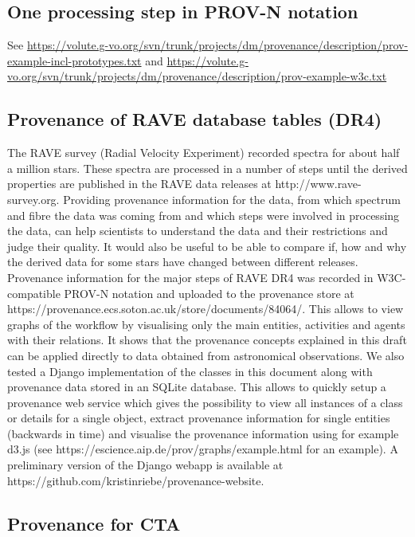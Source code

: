 \subsection{One processing step in PROV-N notation}

See \url{https://volute.g-vo.org/svn/trunk/projects/dm/provenance/description/prov-example-incl-prototypes.txt}
and \url{https://volute.g-vo.org/svn/trunk/projects/dm/provenance/description/prov-example-w3c.txt}


\subsection{Provenance of RAVE database tables (DR4)}
The RAVE survey (Radial Velocity Experiment) recorded spectra for about half a 
million stars. These spectra are processed in a number of steps until the 
derived properties are published in the RAVE data releases at http://www.rave-survey.org.
Providing provenance information for the data, from which spectrum and fibre the
data was coming from and which steps were involved in processing the data, can help scientists
to understand the data and their restrictions and judge their quality.
It would also be useful to be able to compare if, how and why the derived data 
for some stars have changed between different releases.
Provenance information for the major steps of RAVE DR4 was recorded in W3C-compatible 
PROV-N notation and uploaded to the provenance store at 
https://provenance.ecs.soton.ac.uk/store/documents/84064/. This allows to view 
graphs of the workflow by visualising only the main entities, activities and agents 
with their relations. It shows that the provenance concepts explained in this draft 
can be applied directly to data obtained from astronomical observations.
We also tested a Django implementation of the classes in this document along with provenance data 
stored in an SQLite database. This allows to quickly setup a provenance web service
which gives the possibility to view all instances of a class or details for a single object, 
extract provenance information for single entities (backwards in time) and 
visualise the provenance information using for example d3.js (see https://escience.aip.de/prov/graphs/example.html for an example).
A preliminary version of the Django webapp is available at https://github.com/kristinriebe/provenance-website.



\subsection{Provenance for CTA}

